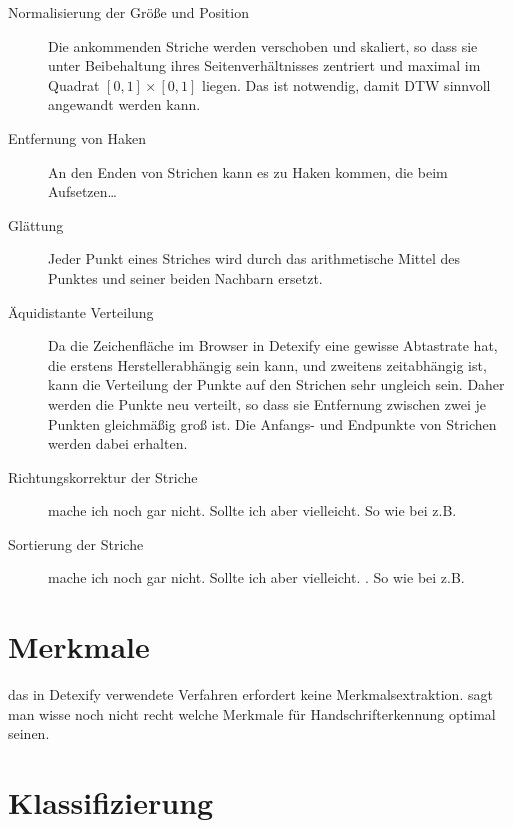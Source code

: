 \begin{description}
  \item[Normalisierung der Größe und Position] Die ankommenden Striche werden verschoben und skaliert, so dass sie unter Beibehaltung ihres Seitenverhältnisses zentriert und maximal im Quadrat \([0,1]\times[0,1]\) liegen. Das ist notwendig, damit \ac{DTW} sinnvoll angewandt werden kann.
  \item[Entfernung von Haken]
  \TODO An den Enden von Strichen kann es zu Haken kommen, die beim Aufsetzen\dots
  \item[Glättung] Jeder Punkt eines Striches wird durch das arithmetische Mittel des Punktes und seiner beiden Nachbarn ersetzt. 
  \item[Äquidistante Verteilung] Da die Zeichenfläche im Browser in Detexify eine gewisse Abtastrate hat, die erstens Herstellerabhängig sein kann, und zweitens zeitabhängig ist, kann die Verteilung der Punkte auf den Strichen sehr ungleich sein. Daher werden die Punkte neu verteilt, so dass sie Entfernung zwischen zwei je Punkten gleichmäßig groß ist. Die Anfangs- und Endpunkte von Strichen werden dabei erhalten. 
  \item[Richtungskorrektur der Striche] \TODO mache ich noch gar nicht. Sollte ich aber vielleicht. So wie bei \citet{Xie:2007p11427} z.B.
  \item[Sortierung der Striche] \TODO mache ich noch gar nicht. Sollte ich aber vielleicht. . So wie bei \citet{Xie:2007p11427} z.B.
\end{description}

\section{Merkmale} \label{sec:merkmale}

\TODO das in Detexify verwendete Verfahren erfordert keine Merkmalsextraktion.
\citet{Xie:2007p11427} sagt man wisse noch nicht recht welche Merkmale für Handschrifterkennung optimal seinen.


\section{Klassifizierung} 


